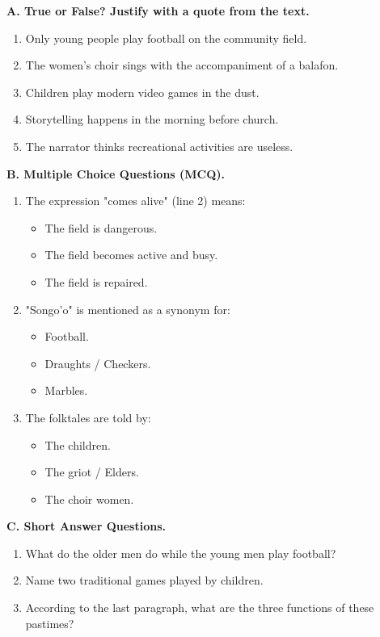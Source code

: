 \documentclass[11pt]{article}
\begin{document}
\begin{exercice}
\textbf{A. True or False? Justify with a quote from the text.}
\begin{enumerate}
    \item Only young people play football on the community field.
    \item The women's choir sings with the accompaniment of a balafon.
    \item Children play modern video games in the dust.
    \item Storytelling happens in the morning before church.
    \item The narrator thinks recreational activities are useless.
\end{enumerate}

\textbf{B. Multiple Choice Questions (MCQ).}
\begin{enumerate}
    \item The expression "comes alive" (line 2) means:
    \begin{itemize}
        \item[a)] The field is dangerous.
        \item[b)] The field becomes active and busy.
        \item[c)] The field is repaired.
    \end{itemize}
    \item "Songo'o" is mentioned as a synonym for:
    \begin{itemize}
        \item[a)] Football.
        \item[b)] Draughts / Checkers.
        \item[c)] Marbles.
    \end{itemize}
    \item The folktales are told by:
    \begin{itemize}
        \item[a)] The children.
        \item[b)] The griot / Elders.
        \item[c)] The choir women.
    \end{itemize}
\end{enumerate}

\textbf{C. Short Answer Questions.}
\begin{enumerate}
    \item What do the older men do while the young men play football?
    \item Name two traditional games played by children.
    \item According to the last paragraph, what are the three functions of these pastimes?
\end{enumerate}
\end{exercice}
\end{document}
